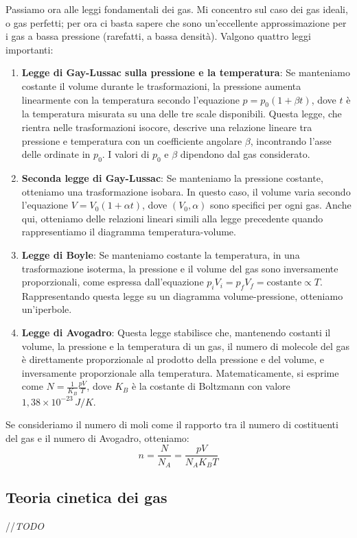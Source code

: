 \documentclass{article}
\begin{document}
Passiamo ora alle leggi fondamentali dei gas. Mi concentro sul caso dei gas ideali, o gas perfetti; per ora ci basta sapere che sono un’eccellente approssimazione per i gas a bassa pressione (rarefatti, a bassa densità). Valgono quattro leggi importanti:
\begin{enumerate}
    \item \textbf{Legge di Gay-Lussac sulla pressione e la temperatura}: Se manteniamo costante il volume durante le trasformazioni, la pressione aumenta linearmente con la temperatura secondo l'equazione \(p = p_0(1+\beta t)\), dove \(t\) è la temperatura misurata su una delle tre scale disponibili. Questa legge, che rientra nelle trasformazioni isocore, descrive una relazione lineare tra pressione e temperatura con un coefficiente angolare \(\beta\), incontrando l'asse delle ordinate in \(p_0\). I valori di \(p_0\) e \(\beta\) dipendono dal gas considerato.
    \item \textbf{Seconda legge di Gay-Lussac}: Se manteniamo la pressione costante, otteniamo una trasformazione isobara. In questo caso, il volume varia secondo l'equazione \(V = V_0(1+\alpha t)\), dove \((V_0, \alpha)\) sono specifici per ogni gas. Anche qui, otteniamo delle relazioni lineari simili alla legge precedente quando rappresentiamo il diagramma temperatura-volume.
    \item  \textbf{Legge di Boyle}: Se manteniamo costante la temperatura, in una trasformazione isoterma, la pressione e il volume del gas sono inversamente proporzionali, come espressa dall'equazione \(p_iV_i = p_fV_f = \text{costante} \propto T\). Rappresentando questa legge su un diagramma volume-pressione, otteniamo un'iperbole.
    \item \textbf{Legge di Avogadro}: Questa legge stabilisce che, mantenendo costanti il volume, la pressione e la temperatura di un gas, il numero di molecole del gas è direttamente proporzionale al prodotto della pressione e del volume, e inversamente proporzionale alla temperatura. Matematicamente, si esprime come \(N = \frac{1}{K_B} \frac{pV}{T}\), dove \(K_B\) è la costante di Boltzmann con valore \(1,38 \times 10^{-23} \, J/K\).
\end{enumerate}
Se consideriamo il numero di moli come il rapporto tra il numero di costituenti del gas e il numero di Avogadro, otteniamo:
\[
    n = \frac{N}{N_A} = \frac{pV}{N_AK_BT}
\]
\subsection{Teoria cinetica dei gas}
//\textit{TODO}
\end{document}
